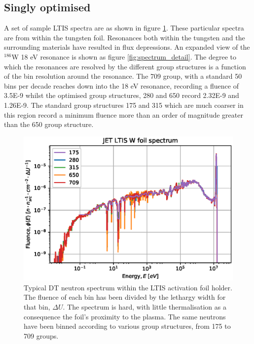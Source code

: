 
\subsection{Singly optimised}

A set of sample LTIS spectra are as shown in figure \ref{fig:spectrum}. These particular spectra are from within the tungsten foil. Resonances both within the tungsten and the surrounding materials have resulted in flux depressions. An expanded view of the $^{186}$W 18 eV resonance is shown as figure \ref{fig:spectrum_detail}. The degree to which the resonances are resolved by the different group structures is a function of the bin resolution around the resonance. The 709 group, with a standard 50 bins per decade reaches down into the 18 eV resonance, recording a fluence of 3.5E-9 whilst the optimised group structures, 280 and 650 record 2.32E-9 and 1.26E-9. The standard group structures 175 and 315 which are much coarser in this region record a minimum fluence more than an order of magnitude greater than the 650 group structure.

\begin{figure}[H]
  \centering
  \includegraphics[width=\linewidth]{W186_spectra_diff_groups.eps}
  \caption{Typical DT neutron spectrum within the LTIS activation foil holder. The fluence of each bin has been divided by the lethargy width for that bin, $\Delta U$. The spectrum is hard, with little thermalisation as a consequence the foil's proximity to the plasma. The same neutrons have been binned according to various group structures, from 175 to 709 groups.}
  \label{fig:spectrum}
\end{figure}

